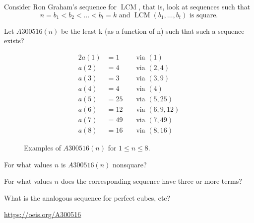 \documentclass{article}
\begin{document}
Consider Ron Graham's sequence for $\operatorname{LCM}$, that is, look at sequences such that \[
  n = b_1 < b_2 < \hdots < b_t = k \text{ and } \operatorname{LCM}(b_1,\hdots,b_t) \text{ is square.}
\]
\begin{question}
  Let $A300516(n)$ be the least k (as a function of n) such that such a sequence
  exists?
\end{question}
\begin{figure}[!h]
  \centering
  \begin{alignat*}{2}
  a(1) &= 1  &&\text{ via } (1)\\
  a(2) &= 4  &&\text{ via } (2, 4)\\
  a(3) &= 3  &&\text{ via } (3, 9)\\
  a(4) &= 4  &&\text{ via } (4)\\
  a(5) &= 25 &&\text{ via } (5, 25)\\
  a(6) &= 12 &&\text{ via } (6, 9, 12)\\
  a(7) &= 49 &&\text{ via } (7, 49)\\
  a(8) &= 16 &&\text{ via } (8, 16)
  \end{alignat*}
  \caption{
    Examples of $A300516(n)$ for $1 \leq n \leq 8$.
  }
\end{figure}

\begin{related}
  \item For what values $n$ is $A300516(n)$ nonsquare?
  \item For what values $n$ does the corresponding sequence have three or more terms?
  \item What is the analogous sequence for perfect cubes, etc?
\end{related}

\begin{references}
  \item \url{https://oeis.org/A300516}
\end{references}
\end{document}
